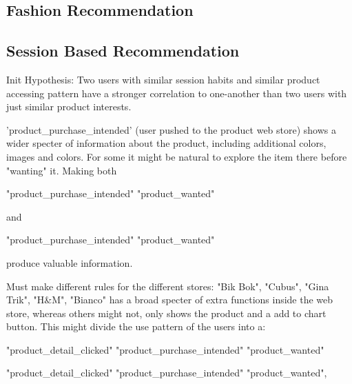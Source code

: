 




\subsection{Fashion Recommendation}



\subsection{Session Based Recommendation}
Init Hypothesis:
Two users with similar session habits and similar product accessing pattern have a stronger correlation to one-another than two users with just similar product interests.


'product\_purchase\_intended' (user pushed to the product web store) shows a wider specter of information about the product, including additional colors, images and colors.
For some it might be natural to explore the item there before "wanting" it. Making both

"product\_purchase\_intended" \Rightarrow "product\_wanted"

and

"product\_purchase\_intended"
\notimplies
"product\_wanted"

produce valuable information.

Must make different rules for the different stores:
"Bik Bok", "Cubus", "Gina Trik", "H\&M", "Bianco" has a broad specter of extra functions inside the web store, whereas others might not, only shows the product and a add to chart button.
This might divide the use pattern of the users into a:

"product\_detail\_clicked" \Rightarrow "product\_purchase\_intended" \Rightarrow "product\_wanted"

"product\_detail\_clicked" \Rightarrow "product\_purchase\_intended"
\notimplies
"product\_wanted",

